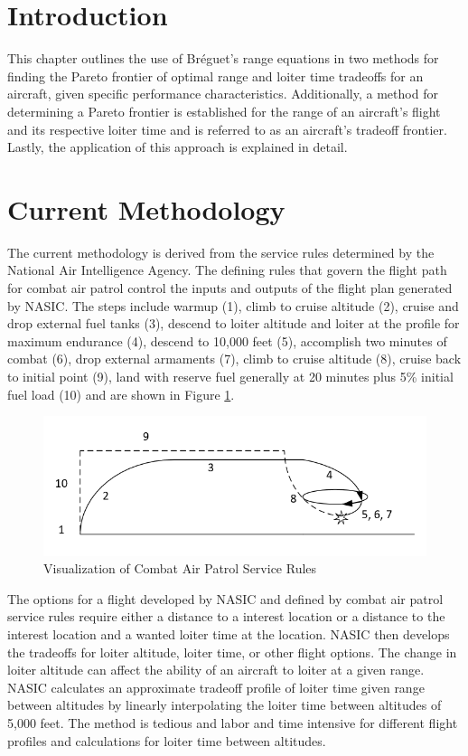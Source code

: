 \section{Introduction}
This chapter outlines the use of Br\'eguet's range equations in two methods for finding the Pareto frontier of optimal range and loiter time tradeoffs for an aircraft, given specific performance characteristics. Additionally, a method for determining a Pareto frontier is established for the range of an aircraft's flight and its respective loiter time and is referred to as an aircraft's tradeoff frontier. Lastly, the application of this approach is explained in detail.\par
\section{Current Methodology}
The current methodology is derived from the service rules determined by the National Air Intelligence Agency. The defining rules that govern the flight path for combat air patrol control the inputs and outputs of the flight plan generated by NASIC. The steps include warmup (1), climb to cruise altitude (2), cruise and drop external fuel tanks (3), descend to loiter altitude and loiter at the profile for maximum endurance (4), descend to 10,000 feet (5), accomplish two minutes of combat (6), drop external armaments (7), climb to cruise altitude (8), cruise back to initial point (9), land with reserve fuel generally at 20 minutes plus 5\% initial fuel load (10) and are shown in Figure \ref{fig: serviceRules}.\par
\begin{figure}[H]
    \centering
    \includegraphics{Thesis/Method/CombatServiceRules.PNG}
    \caption{Visualization of Combat Air Patrol Service Rules}
    \label{fig: serviceRules}
\end{figure}
The options for a flight developed by NASIC and defined by combat air patrol service rules require either a distance to a interest location or a distance to the interest location and a wanted loiter time at the location. NASIC then develops the tradeoffs for loiter altitude, loiter time, or other flight options. The change in loiter altitude can affect the ability of an aircraft to loiter at a given range. NASIC calculates an approximate tradeoff profile of loiter time given range between altitudes by linearly interpolating the loiter time between altitudes of 5,000 feet. The method is tedious and labor and time intensive for different flight profiles and calculations for loiter time between altitudes.
